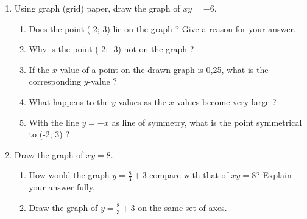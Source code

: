           
          \label{m39341*id249267}\begin{enumerate}[noitemsep, label=\textbf{\arabic*}. ] 
            \label{m39341*uid163}\item Using graph (grid) paper, draw the graph of \begin{math}xy=-6\end{math}.
\label{m39341*id249301}\begin{enumerate}[noitemsep, label=\textbf{\alph*}. ] 
            \label{m39341*uid164}\item Does the point (-2; 3) lie on the graph ? Give a reason for your answer.
\label{m39341*uid165}\item Why is the point (-2; -3) not on the graph ?
\label{m39341*uid166}\item If the \begin{math}x\end{math}-value of a point on the drawn graph is 0,25, what is the corresponding \begin{math}y\end{math}-value ?
\label{m39341*uid167}\item What happens to the \begin{math}y\end{math}-values as the \begin{math}x\end{math}-values become very large ?
\label{m39341*uid168}\item With the line \begin{math}y=-x\end{math} as line of symmetry, what is the point symmetrical to (-2; 3) ?
\end{enumerate}
                \label{m39341*uid169}\item Draw the graph of \begin{math}xy=8\end{math}.
\label{m39341*id249462}\begin{enumerate}[noitemsep, label=\textbf{\alph*}. ] 
            \label{m39341*uid170}\item How would the graph \begin{math}y=\frac{8}{3}+3\end{math} compare with that of \begin{math}xy=8\end{math}? Explain your answer fully.
\label{m39341*uid171}\item Draw the graph of \begin{math}y=\frac{8}{3}+3\end{math} on the same set of axes.
\end{enumerate}
                \end{enumerate}
        
